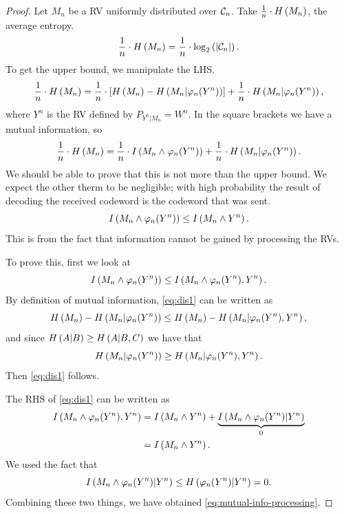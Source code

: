 \begin{proof}
	Let $M_n$ be a \ac{RV} uniformly distributed over $\mathcal{C}_n$.
	Take $\frac{1}{n} \cdot H\left({M_n}\right)$, the average entropy.
	\begin{equation*}
		\frac{1}{n} \cdot H\left({M_n}\right) =
		\frac{1}{n} \cdot \log_2 \left( {\left|{\mathcal{C}_n}\right|} \right).
	\end{equation*}
	To get the upper bound, we manipulate the \ac{LHS}.
	\begin{equation*}
		\frac{1}{n} \cdot H\left({M_n}\right) =
		\frac{1}{n} \cdot \left[ H\left({M_n}\right) - H\left({M_n | \varphi_n(Y^n)}\right) \right] +
		\frac{1}{n} \cdot H\left({M_n | \varphi_n(Y^n)}\right),
	\end{equation*}
	where $Y^n$ is the \ac{RV} defined by $P_{Y^n | M_n} = W^n$.
	In the square brackets we have a mutual information, so
	\begin{equation*}
		\frac{1}{n} \cdot H\left({M_n}\right) =
		\frac{1}{n} \cdot I \left( {M_n \land \varphi_n(Y^n)} \right) +
		\frac{1}{n} \cdot H\left({M_n | \varphi_n(Y^n)}\right).
	\end{equation*}
	We should be able to prove that this is not more than the upper bound.
	We expect the other therm to be negligible; with high probability the result of decoding the received codeword is the codeword that was sent.
	\begin{equation} \label{eq:mutual-info-processing}
		I \left( {M_n \land \varphi_n(Y^n)} \right) \le
		I \left( {M_n \land Y^n} \right).
	\end{equation}
	This is from the fact that information cannot be gained by processing the \acp{RV}.

	To prove this, first we look at
	\begin{equation} \label{eq:dis1}
		I \left( {M_n \land \varphi_n(Y^n)} \right) \le
		I \left( {M_n \wedge \varphi_n(Y^n), Y^n} \right).
	\end{equation}
	By definition of mutual information, \cref{eq:dis1} can be written as
	\begin{equation*}
		H\left({M_n}\right) - H\left({M_n | \varphi_n(Y^n)}\right) \le
		H\left({M_n}\right) - H\left({M_n | \varphi_n(Y^n), Y^n}\right),
	\end{equation*}
	and since $H\left({A | B}\right) \ge H\left({A | B, C}\right)$ we have that
	\begin{equation*}
		H\left({M_n | \varphi_n(Y^n)}\right) \ge
		H\left({M_n | \varphi_n(Y^n), Y^n}\right).
	\end{equation*}
	Then \cref{eq:dis1} follows.

	The \ac{RHS} of \cref{eq:dis1} can be written as
	\begin{align*}
		I \left( {M_n \land \varphi_n(Y^n), Y^n} \right)
		& =
		I \left( {M_n \land Y^n} \right) +
		\underbrace{I \left( {M_n \land \varphi_n(Y^n) | Y^n} \right)}_{0}
		\\
		& =
		I \left( {M_n \land Y^n} \right).
	\end{align*}
	We used the fact that
	\begin{equation*}
		I \left( {M_n \land \varphi_n(Y^n) | Y^n} \right) \le
		H\left({\varphi_n(Y^n) | Y^n}\right) = 0.
	\end{equation*}
	Combining these two things, we have obtained \cref{eq:mutual-info-processing}.


\end{proof}
